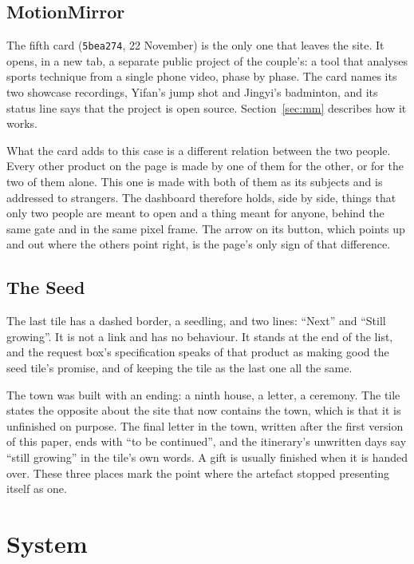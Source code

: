 \documentclass[sigconf,nonacm]{acmart}
\newcommand{\code}[1]{\textnormal{\texttt{\small #1}}}
\begin{document}
\subsection{MotionMirror}
The fifth card (\code{5bea274}, 22 November) is the only one that leaves the site. It opens, in
a new tab, a separate public project of the couple's: a tool that analyses sports technique
from a single phone video, phase by phase. The card names its two showcase recordings, Yifan's
jump shot and Jingyi's badminton, and its status line says that the project is open source. Section~\ref{sec:mm} describes how it works.

What the card adds to this case is a different relation between the two people. Every other
product on the page is made by one of them for the other, or for the two of them alone. This
one is made with both of them as its subjects and is addressed to strangers. The dashboard
therefore holds, side by side, things that only two people are meant to open and a thing meant
for anyone, behind the same gate and in the same pixel frame. The arrow on its button, which
points up and out where the others point right, is the page's only sign of that difference.

\subsection{The Seed}
The last tile has a dashed border, a seedling, and two lines: ``Next'' and ``Still growing''.
It is not a link and has no behaviour. It stands at the end of the list,
and the request box's specification speaks of that product as making good the seed tile's
promise, and of keeping the tile as the last one all the same.

The town was built with an ending: a ninth house, a letter, a ceremony. The tile states the
opposite about the site that now contains the town, which is that it is unfinished on purpose.
The final letter in the town, written after the first version of this paper, ends with ``to be
continued'', and the itinerary's unwritten days say ``still growing'' in the tile's own words.
A gift is usually finished when it is handed over. These three places mark the point where the
artefact stopped presenting itself as one.

\section{System}\label{sec:system}
\end{document}
